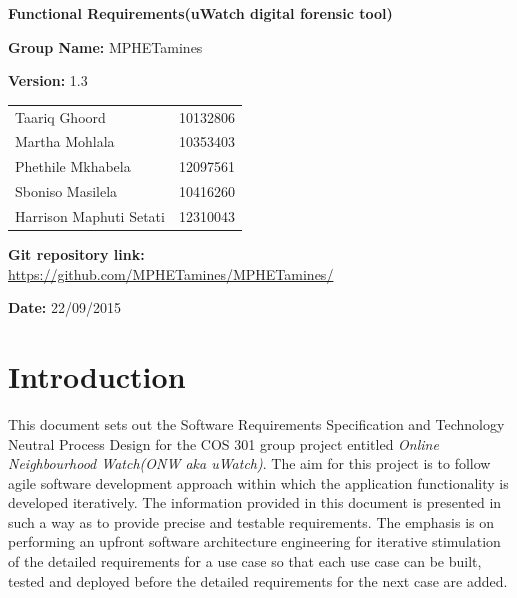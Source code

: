 \documentclass[a4paper,12pt]{article}
\begin{document}
\begin{center}

\Huge\textbf{Functional Requirements(uWatch digital forensic tool)\\}
																											
\vspace{2 cm}

\LARGE\textbf{Group Name:} MPHETamines\newline
 
 
\LARGE\textbf{Version:} 1.3\newline
 
 
 
\vspace{0.5 cm}
\begin{tabular}{lr}
Taariq Ghoord&10132806
\\ 
Martha Mohlala&10353403
\\
Phethile Mkhabela&12097561
\\
Sboniso Masilela&10416260
\\
Harrison Maphuti Setati&12310043\\
\end{tabular}

\vspace{1cm}
\textbf{Git repository link:\\}
\url{https://github.com/MPHETamines/MPHETamines/}

\vspace{1cm}
\textbf{Date:} 22/09/2015
\end{center}
\newpage

\tableofcontents







\newpage
{}

\section{Introduction}
This document sets out the Software Requirements Specification and Technology Neutral Process Design for the COS 301 group project entitled \textit{Online Neighbourhood Watch(ONW aka uWatch)}.
The aim for this project is to follow agile software development approach within which the application functionality is developed 
iteratively. 
The information provided in this document is presented in such a way as to provide precise and testable requirements. The emphasis is on performing an upfront software 
architecture engineering for iterative stimulation of the detailed requirements for a use case so that each use case can be built, tested and deployed before the detailed 
requirements for the next case are added.
\end{document}

